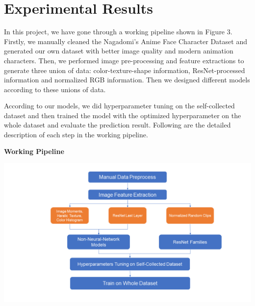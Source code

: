 \documentclass[11.5pt]{article}
\begin{document}
    \section{Experimental Results}
    \begin{minipage}{0.5\textwidth}
        In this project, we have gone through a working pipeline shown in Figure 3.
        Firstly, we manually cleaned the Nagadomi's Anime Face Character Dataset and generated our own dataset with better image quality and modern animation characters.
        Then, we performed image pre-processing and feature extractions to generate three union of data: color-texture-shape information, ResNet-processed information and normalized RGB information.
        Then we designed different models according to these unions of data.
        
        According to our models, we did hyperparameter tuning on the self-collected dataset and then trained the model with the optimized hyperparameter on the whole dataset and evaluate the prediction result.
        Following are the detailed description of each step in the working pipeline.
    \end{minipage}
    \begin{minipage}{0.5\textwidth}
        \begin{center}
            \textbf{Working Pipeline}
        \end{center}
        \includegraphics[width=\textwidth]{images/working_pipeline.png}
    \end{minipage}
\end{document}
